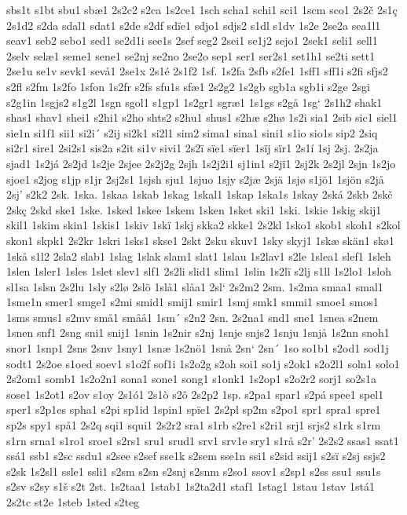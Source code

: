 sbs1t
s1bt
sbu1
sbæ1
2s2c2
s2ca
1s2ce1
1sch
scha1
schi1
sci1
1scm
sco1
2s2č
2s1ç
2s1d2
s2da
sdal1
sdat1
s2de
s2df
sdïe1
sdjo1
sdjs2
s1dl
s1dv
1s2e
2se2a
sea1l1
seav1
seb2
sebo1
sed1
se2d1i
see1s
2sef
seg2
2sei1
se1j2
sejo1
2sek1
seli1
sell1
2selv
selæ1
seme1
sene1
se2nj
se2no
2se2o
sep1
ser1
ser2s1
set1h1
se2ti
sett1
2se1u
se1v
sevk1
sevå1
2se1x
2s1é
2s1f2
1sf.
1s2fa
2sfb
s2fe1
1sff1
sff1i
s2fi
sfjs2
s2fl
s2fm
1s2fo
1sfon
1s2fr
s2fs
sfu1s
sfæ1
2s2g2
1s2gb
sgb1a
sgb1i
s2ge
2sgi
s2g1in
1sgjs2
s1g2l
1sgn
sgol1
s1gp1
1s2gr1
sgræ1
1s1gs
s2gå
1sg`
2s1h2
shak1
shas1
shav1
shei1
s2hi1
s2ho
shts2
s2hu1
shus1
s2hæ
s2hø
1s2i
sia1
2sib
sic1
siel1
sie1n
si1f1
sii1
si2i´
s2ij
si2k1
si2l1
sim2
sima1
sina1
sini1
s1io
sio1s
sip2
2siq
si2r1
sire1
2si2s1
sis2a
s2it
si1v
sivi1
2s2ï
sïe1
sïer1
1sïj
sïr1
2s1í
1sj
2sj.
2s2ja
sjad1
1s2já
2s2jd
1s2je
2sjee
2s2j2g
2sjh
1s2j2i1
sj1in1
s2jï1
2sj2k
2s2jl
2sjn
1s2jo
sjoe1
s2jog
s1jp
s1jr
2sj2s1
1sjsh
sju1
1sjuo
1sjy
s2jæ
2sjä
1sjø
s1jö1
1sjön
s2jå
2sj'
s2k2
2sk.
1ska.
1skaa
1skab
1skag
1skal1
1skap
1ska1s
1skay
2ská
2skb
2skč
2skç
2skd
ske1
1ske.
1sked
1skee
1skem
1sken
1sket
ski1
1ski.
1skie
1skig
skij1
skil1
1skim
skin1
1skis1
1skiv
1skï
1skj
skka2
skke1
2s2kl
1sko1
skob1
skoh1
s2kol
skon1
skpk1
2s2kr
1skri
1sks1
skse1
2skt
2sku
skuv1
1sky
skyj1
1skæ
skän1
skø1
1skå
s1l2
2sla2
slab1
1slag
1slak
slam1
slat1
1slau
1s2lav1
s2le
1slea1
slef1
1sleh
1slen
1sler1
1sles
1slet
slev1
slf1
2s2li
slid1
slim1
1slin
1s2lï
s2lj
s1ll
1s2lo1
1sloh
sl1sa
1slsn
2s2lu
1sly
s2lø
2slö
1slå1
slåa1
2sl`
2s2m2
2sm.
1s2ma
smaa1
smal1
1sme1n
smer1
smge1
s2mi
smid1
smij1
smir1
1smj
smk1
smmi1
smoe1
smos1
1sms
smus1
s2mv
små1
småå1
1sm´
s2n2
2sn.
2s2na1
snd1
sne1
1snea
s2nem
1snen
snf1
2sng
sni1
snij1
1snin
1s2nir
s2nj
1snje
snjs2
1snju
1snjå
1s2nn
snoh1
snor1
1snp1
2sns
2snv
1sny1
1snæ
1s2nö1
1snå
2sn`
2sn´
1so
so1b1
s2od1
sod1j
sodt1
2s2oe
s1oed
soev1
s1o2f
sof1i
1s2o2g
s2oh
soi1
so1j
s2ok1
s2o2l1
soln1
solo1
2s2om1
somb1
1s2o2n1
sona1
sone1
song1
s1onk1
1s2op1
s2o2r2
sorj1
so2s1a
sose1
1s2ot1
s2ov
s1oy
2s1ó1
2s1ò
s2ô
2s2p2
1sp.
s2pa1
spar1
s2pá
spee1
spel1
sper1
s2p1es
spha1
s2pi
sp1id
1spin1
spïe1
2s2pl
sp2m
s2po1
spr1
spra1
spre1
sp2s
spy1
spå1
2s2q
sqi1
squi1
2s2r2
sra1
s1rb
s2re1
s2ri1
srj1
srjs2
s1rk
s1rm
s1rn
srna1
s1ro1
sroe1
s2rs1
sru1
srud1
srv1
srv1e
sry1
s1rå
s2r'
2s2s2
ssas1
ssat1
ssá1
ssb1
s2sc
ssdu1
s2see
s2sef
sse1k
s2sem
sse1n
ssi1
s2sid
ssij1
s2sï
s2sj
ssjs2
s2sk
1s2sl1
ssle1
ssli1
s2sm
s2sn
s2snj
s2snm
s2so1
ssov1
s2sp1
s2ss
ssu1
ssu1s
s2sv
s2sy
s1š
s2t
2st.
1s2taa1
1stab1
1s2ta2d1
staf1
1stag1
1stau
1stav
1stá1
2s2tc
st2e
1steb
1sted
s2teg
